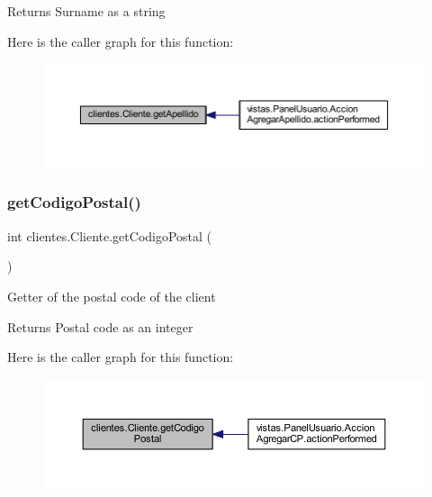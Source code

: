 \begin{DoxyReturn}{Returns}
Surname as a string 
\end{DoxyReturn}
Here is the caller graph for this function\+:\nopagebreak
\begin{figure}[H]
\begin{center}
\leavevmode
\includegraphics[width=350pt]{classclientes_1_1_cliente_a2ad0717033efce59b2fc50435cdc40ac_icgraph}
\end{center}
\end{figure}
\mbox{\label{classclientes_1_1_cliente_aef07d8a482516e794ef94a921203fbef}} 
\subsubsection{\texorpdfstring{get\+Codigo\+Postal()}{getCodigoPostal()}}
{\footnotesize\ttfamily int clientes.\+Cliente.\+get\+Codigo\+Postal (\begin{DoxyParamCaption}{ }\end{DoxyParamCaption})}

Getter of the postal code of the client

\begin{DoxyReturn}{Returns}
Postal code as an integer 
\end{DoxyReturn}
Here is the caller graph for this function\+:\nopagebreak
\begin{figure}[H]
\begin{center}
\leavevmode
\includegraphics[width=350pt]{classclientes_1_1_cliente_aef07d8a482516e794ef94a921203fbef_icgraph}
\end{center}
\end{figure}
\mbox{\label{classclientes_1_1_cliente_a3fe03993034c7fd7ca5a3433a3543508}} 
